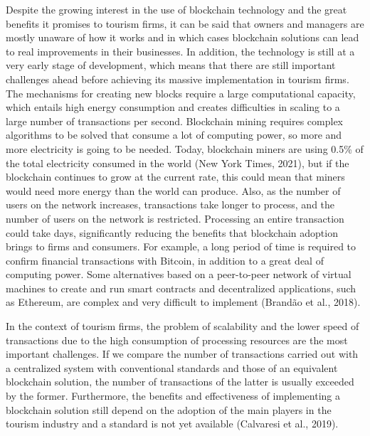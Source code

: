 \documentclass[
  letterpaper,
  DIV=11,
  numbers=noendperiod]{scrreprt}
\begin{document}
Despite the growing interest in the use of blockchain technology and the
great benefits it promises to tourism firms, it can be said that owners
and managers are mostly unaware of how it works and in which cases
blockchain solutions can lead to real improvements in their businesses.
In addition, the technology is still at a very early stage of
development, which means that there are still important challenges ahead
before achieving its massive implementation in tourism firms. The
mechanisms for creating new blocks require a large computational
capacity, which entails high energy consumption and creates difficulties
in scaling to a large number of transactions per second. Blockchain
mining requires complex algorithms to be solved that consume a lot of
computing power, so more and more electricity is going to be needed.
Today, blockchain miners are using 0.5\% of the total electricity
consumed in the world (New York Times, 2021), but if the blockchain
continues to grow at the current rate, this could mean that miners would
need more energy than the world can produce. Also, as the number of
users on the network increases, transactions take longer to process, and
the number of users on the network is restricted. Processing an entire
transaction could take days, significantly reducing the benefits that
blockchain adoption brings to firms and consumers. For example, a long
period of time is required to confirm financial transactions with
Bitcoin, in addition to a great deal of computing power. Some
alternatives based on a peer-to-peer network of virtual machines to
create and run smart contracts and decentralized applications, such as
Ethereum, are complex and very difficult to implement (Brandão et al.,
2018).

In the context of tourism firms, the problem of scalability and the
lower speed of transactions due to the high consumption of processing
resources are the most important challenges. If we compare the number of
transactions carried out with a centralized system with conventional
standards and those of an equivalent blockchain solution, the number of
transactions of the latter is usually exceeded by the former.
Furthermore, the benefits and effectiveness of implementing a blockchain
solution still depend on the adoption of the main players in the tourism
industry and a standard is not yet available (Calvaresi et al., 2019).
\end{document}
